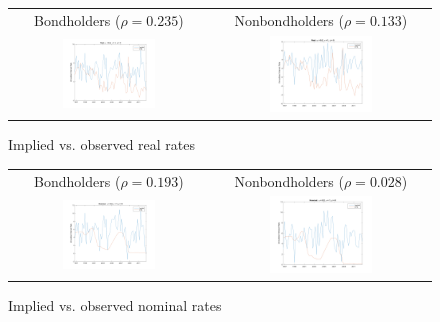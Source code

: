 \begin{figure}[h!]
\ContinuedFloat*
\centering
\begin{tabular}{cc}
Bondholders ($\rho = 0.235$) & Nonbondholders ($\rho = 0.133$) \\
\includegraphics[width=0.49\textwidth]{figs/cex/implied-vs-ffr/bh_real} &
\includegraphics[width=0.49\textwidth]{figs/cex/implied-vs-ffr/nbh_real}
\end{tabular}
\caption{Implied vs. observed real rates}
\label{implied-vs-ffr-cex-real}
\end{figure}

\begin{figure}[h!]
\ContinuedFloat
\centering
\begin{tabular}{cc}
Bondholders ($\rho = 0.193$) & Nonbondholders ($\rho = 0.028$) \\
\includegraphics[width=0.49\textwidth]{figs/cex/implied-vs-ffr/bh_nominal} &
\includegraphics[width=0.49\textwidth]{figs/cex/implied-vs-ffr/nbh_nominal}
\end{tabular}
\caption{Implied vs. observed nominal rates}
\label{implied-vs-ffr-cex-nominal}
\end{figure}



